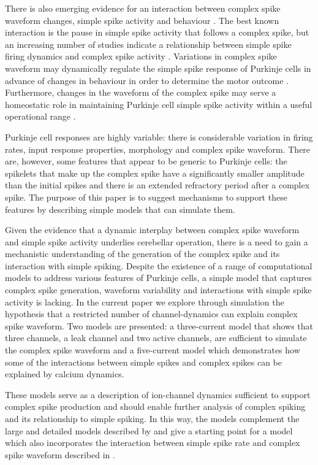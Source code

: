 \documentclass[twocolumn]{svjour3}          %
\begin{document}
There is also emerging evidence for an interaction between complex
spike waveform changes, simple spike activity and behaviour
\citep{YangLispberger2014,StrengEtAl2017}. The best known interaction
is the pause in simple spike activity that follows a complex spike, but
an increasing number of studies indicate a relationship between simple
spike firing dynamics and complex spike activity
\citep{Mano1970,Gilbert1976,CampbellHesslow1986,HashimotoKano1998,ServaisEtAl2004,MarutaEtAl2007,WarnaarEtAl2015,BurroughsEtAl2016}.
Variations in complex spike waveform may dynamically regulate the
simple spike response of Purkinje cells in advance of changes in
behaviour in order to determine the motor outcome
\citep{StrengEtAl2017}. Furthermore, changes in the waveform of the
complex spike may serve a homeostatic role in maintaining Purkinje
cell simple spike activity within a useful operational range
\citep{BurroughsEtAl2016}.

Purkinje cell responses are highly variable: there is considerable
variation in firing rates, input response properties, morphology and
complex spike waveform. There are, however, some features that appear
to be generic to Purkinje cells: the spikelets that make up the
complex spike have a significantly smaller amplitude than the initial
spikes and there is an extended refractory period after a complex
spike. The purpose of this paper is to suggest mechanisms to support
these features by describing simple models that can simulate them.

Given the evidence that a dynamic interplay between complex spike
waveform and simple spike activity underlies cerebellar operation,
there is a need to gain a mechanistic understanding of the generation
of the complex spike and its interaction with simple spiking. Despite
the existence of a range of computational models to address various
features of Purkinje cells, a simple model that captures complex spike
generation, waveform variability and interactions with simple spike
activity is lacking. In the current paper we explore through
simulation the hypothesis that a restricted number of channel-dynamics
can explain complex spike waveform. Two models are presented: a
three-current model that shows that three channels, a leak channel and
two active channels, are sufficient to simulate the complex spike
waveform and a five-current model which demonstrates how some of the
interactions between simple spikes and complex spikes can be explained
by calcium dynamics.

These models serve as a description of ion-channel dynamics sufficient
to support complex spike production and should enable further analysis
of complex spiking and its relationship to simple spiking. In this
way, the models complement the large and detailed models described by
\citet{VeysEtAl2013,ZangEtAl2018} and give a starting point for a
model which also incorporates the interaction between simple spike
rate and complex spike waveform described in
\citet{BurroughsEtAl2016}.
\end{document}
